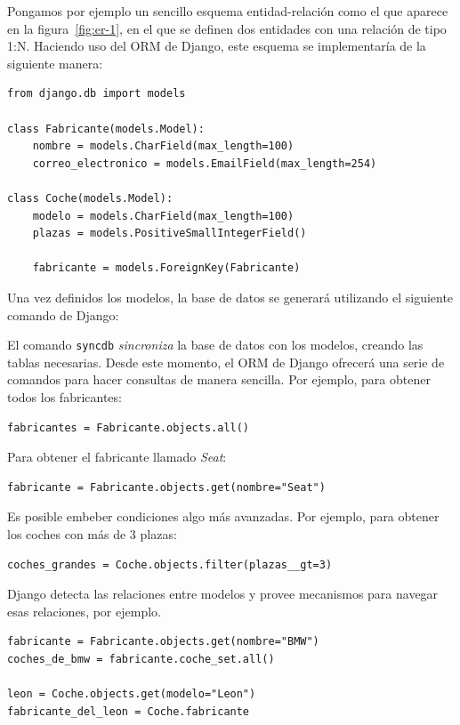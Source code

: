 Pongamos por ejemplo un sencillo esquema entidad-relación como el que aparece en
la figura~\ref{fig:er-1}, en el que se definen dos entidades con una relación de
tipo 1:N. Haciendo uso del ORM de Django, este esquema se implementaría de la
siguiente manera:

\begin{verbatim}
from django.db import models

class Fabricante(models.Model):
    nombre = models.CharField(max_length=100)
    correo_electronico = models.EmailField(max_length=254)

class Coche(models.Model):
    modelo = models.CharField(max_length=100)
    plazas = models.PositiveSmallIntegerField()

    fabricante = models.ForeignKey(Fabricante)
\end{verbatim}

Una vez definidos los modelos, la base de datos se generará utilizando el
siguiente comando de Django:


El comando \texttt{syncdb} \textit{sincroniza} la base de datos con los modelos,
creando las tablas necesarias. Desde este momento, el ORM de Django ofrecerá una
serie de comandos para hacer consultas de manera sencilla. Por ejemplo, para
obtener todos los fabricantes:

\begin{verbatim}
fabricantes = Fabricante.objects.all()  
\end{verbatim}

Para obtener el fabricante llamado \textit{Seat}:

\begin{verbatim}
fabricante = Fabricante.objects.get(nombre="Seat") 
\end{verbatim}

Es posible embeber condiciones algo más avanzadas. Por ejemplo, para obtener los
coches con más de 3 plazas:

\begin{verbatim}
coches_grandes = Coche.objects.filter(plazas__gt=3)
\end{verbatim}

Django detecta las relaciones entre modelos y provee mecanismos para navegar
esas relaciones, por ejemplo.

\begin{verbatim}
fabricante = Fabricante.objects.get(nombre="BMW") 
coches_de_bmw = fabricante.coche_set.all()

leon = Coche.objects.get(modelo="Leon")
fabricante_del_leon = Coche.fabricante
\end{verbatim}

